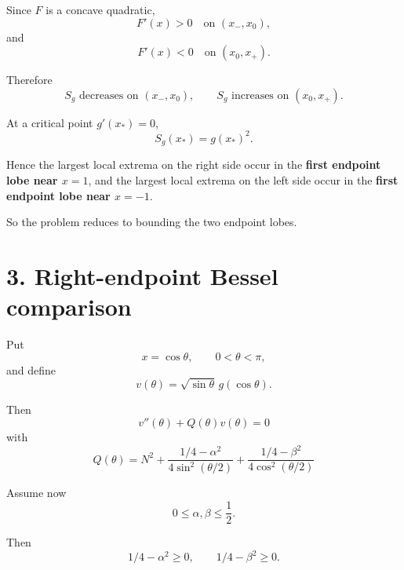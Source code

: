 \documentclass[11pt]{article}
\begin{document}
Since \(F\) is a concave quadratic,
\begin{equation*}
F'(x)>0\quad\text{on }(x_-,x_0),
\end{equation*}
and
\begin{equation*}
F'(x)<0\quad\text{on }(x_0,x_+).
\end{equation*}

Therefore
\begin{equation}
\boxed{
S_g \text{ decreases on }(x_-,x_0),
\qquad
S_g \text{ increases on }(x_0,x_+).
}
\tag{8}
\end{equation}

At a critical point \(g'(x_*)=0\),
\begin{equation*}
S_g(x_*)=g(x_*)^2.
\end{equation*}

Hence the largest local extrema on the right side occur in the \textbf{first endpoint lobe near \(x=1\)}, and the largest local extrema on the left side occur in the \textbf{first endpoint lobe near \(x=-1\)}.

So the problem reduces to bounding the two endpoint lobes.

\section*{3. Right-endpoint Bessel comparison}

Put
\begin{equation*}
x=\cos\theta,\qquad 0<\theta<\pi,
\end{equation*}
and define
\begin{equation*}
v(\theta)=\sqrt{\sin\theta}\,g(\cos\theta).
\end{equation*}

Then
\begin{equation}
\boxed{
v''(\theta)+Q(\theta)v(\theta)=0
}
\tag{9}
\end{equation}
with
\begin{equation}
\boxed{
Q(\theta)
=
N^2
+
\frac{1/4-\alpha^2}{4\sin^2(\theta/2)}
+
\frac{1/4-\beta^2}{4\cos^2(\theta/2)}
}
\tag{10}
\end{equation}

Assume now
\begin{equation*}
0\le \alpha,\beta\le\frac12.
\end{equation*}

Then
\begin{equation*}
1/4-\alpha^2\ge0,\qquad 1/4-\beta^2\ge0.
\end{equation*}
\end{document}
